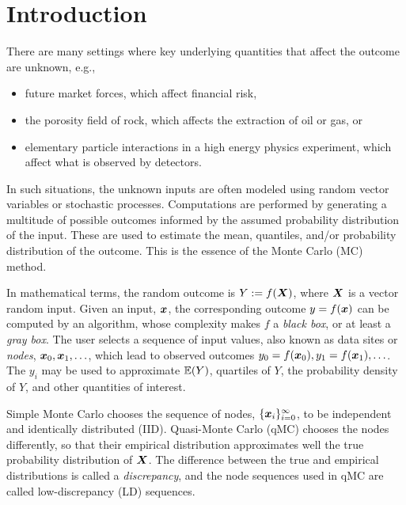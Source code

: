\documentclass{svproc}
\newcounter{algorithm}%
\begin{document}
\section{Introduction} \label{sec:intro}
There are many settings where key underlying quantities that affect the outcome are unknown, e.g.,
\begin{itemize}
	\item future market forces, which affect financial risk,
	\item the porosity field of rock, which affects the extraction of oil or gas, or
	\item elementary particle interactions in a high energy physics experiment, which affect what is observed by detectors.
\end{itemize}
In such situations, the unknown inputs are often modeled using random vector variables or stochastic processes.  Computations are performed by generating a multitude of possible outcomes informed by the assumed probability distribution of the input. These are used to estimate the mean, quantiles, and/or probability distribution of the outcome.  This is the essence of the Monte Carlo (MC) method.

In mathematical terms, the random outcome is $Y := f({\boldsymbol{X}})$, where ${\boldsymbol{X}}$ is a vector random input.  Given an input, ${\boldsymbol{x}}$, the corresponding outcome  $y = f({\boldsymbol{x}})$ can be computed by an algorithm, whose complexity makes $f$ a \emph{black box}, or at least a \emph{gray box}.  The user selects a sequence of input values, also known as data sites or \emph{nodes}, ${\boldsymbol{x}}_0, {\boldsymbol{x}}_1, \ldots$, which lead to observed outcomes $y_0 = f({\boldsymbol{x}}_0), y_1 = f({\boldsymbol{x}}_1), \ldots$.  The $y_i$ may be used to approximate ${\mathbb{E}}(Y)$, quartiles of $Y$, the probability density of $Y$, and other quantities of interest.

Simple  Monte Carlo chooses the sequence of nodes, $\{{\boldsymbol{x}}_i\}_{i=0}^\infty$, to be independent and identically distributed (IID).  Quasi-Monte Carlo (qMC)  chooses the nodes differently, so that their empirical distribution approximates well the true probability distribution of ${\boldsymbol{X}}$.  The difference between  the true and empirical distributions is called a \emph{discrepancy}, and the node sequences used in qMC are called low-discrepancy (LD) sequences.
\end{document}
